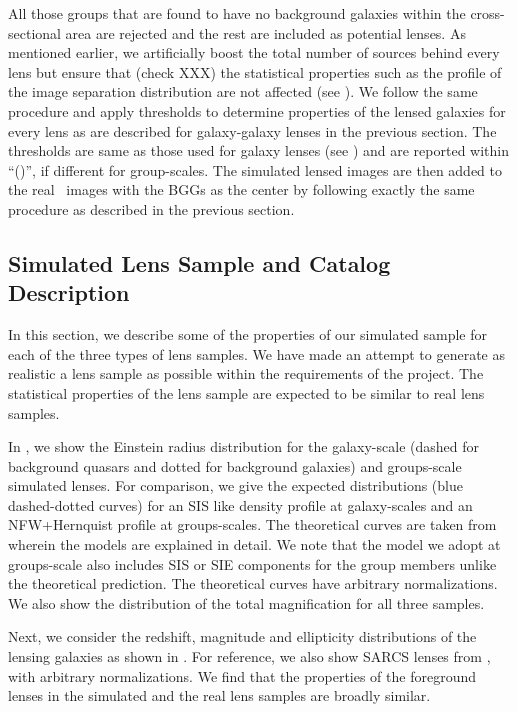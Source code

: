 \documentclass[useAMS,usenatbib,a4paper]{mn2e}
\begin{document}
All those groups that are found to have no background galaxies within the
cross-sectional area are rejected and the rest are included as potential lenses.
As mentioned earlier, we artificially boost the total number of sources behind
every lens but ensure that (check XXX) the statistical properties such as the profile of the
image separation distribution are not affected (see ). We
follow the same procedure and apply thresholds to determine properties
of the lensed galaxies for every lens as are described for galaxy-galaxy lenses
in the previous section. The thresholds are same as those used for
galaxy lenses (see ) and are reported within ``()'', if
different for group-scales. The simulated lensed images are then added
to the real \cfhtls~images with the BGGs as the center by following
exactly the same procedure as described in the previous section.


\subsection{Simulated Lens Sample and Catalog Description}

In this section, we describe some of the properties of our simulated sample for
each of the three types of lens samples. We have made an attempt to
generate as realistic a lens sample as possible within the requirements
of the \sw project. The statistical properties of the lens sample are
expected to be similar to real lens samples.

In , we show the Einstein radius distribution for the
galaxy-scale (dashed for background quasars and dotted for background galaxies)
and groups-scale simulated lenses. For comparison, we give the expected
distributions (blue dashed-dotted curves) for an SIS like density profile at
galaxy-scales and an NFW+Hernquist profile at groups-scales. The
theoretical curves are taken from \citet{More2012} wherein the models are
explained in detail. We note that the model we adopt at groups-scale also
includes SIS or SIE components for the group members unlike the theoretical
prediction. The theoretical curves have arbitrary normalizations. We
also show the distribution of the total magnification for all three
samples.

Next, we consider the redshift, magnitude and ellipticity distributions
of the lensing galaxies as shown in . For reference,
we also show SARCS lenses from \citet{More2012}, with arbitrary
normalizations. We find that the properties of the foreground lenses in
the simulated and the real lens samples are broadly similar.
\end{document}
